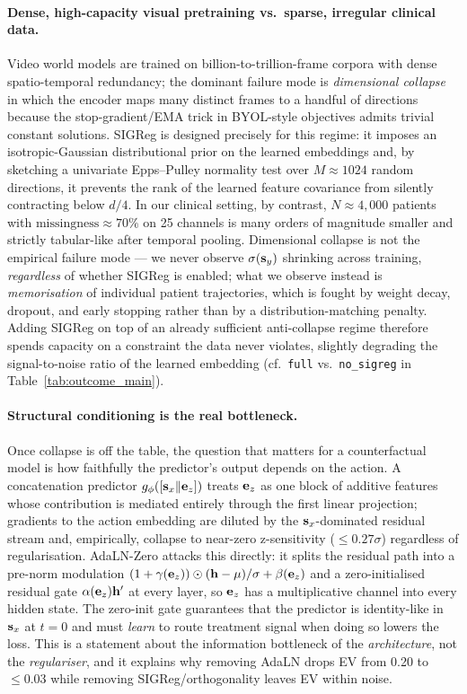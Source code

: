 \paragraph{Dense, high-capacity visual pretraining vs.\ sparse,
irregular clinical data.} Video world models are trained on
billion-to-trillion-frame corpora with dense spatio-temporal redundancy;
the dominant failure mode is \emph{dimensional collapse} in which the
encoder maps many distinct frames to a handful of directions because
the stop-gradient/EMA trick in BYOL-style objectives admits trivial
constant solutions. SIGReg is designed precisely for this regime: it
imposes an isotropic-Gaussian distributional prior on the learned
embeddings and, by sketching a univariate Epps--Pulley normality test
over $M{\approx}1024$ random directions, it prevents the rank of the
learned feature covariance from silently contracting below $d/4$.
In our clinical setting, by contrast, $N{\approx}4{,}000$ patients with
$\mathrm{missingness}\approx 70\%$ on 25 channels is many orders of
magnitude smaller and strictly tabular-like after temporal pooling.
Dimensional collapse is not the empirical failure mode --- we never
observe $\sigma(\mathbf{s}_y)$ shrinking across training, \emph{regardless} of
whether SIGReg is enabled; what we observe instead is
\emph{memorisation} of individual patient trajectories, which is fought
by weight decay, dropout, and early stopping rather than by a
distribution-matching penalty. Adding SIGReg on top of an already
sufficient anti-collapse regime therefore spends capacity on a
constraint the data never violates, slightly degrading the signal-to-noise
ratio of the learned embedding (cf.\ \texttt{full} vs.\ \texttt{no\_sigreg}
in Table~\ref{tab:outcome_main}).

\paragraph{Structural conditioning is the real bottleneck.} Once
collapse is off the table, the question that matters for a
counterfactual model is how faithfully the predictor's output depends
on the action. A concatenation predictor
$g_\phi([\mathbf{s}_x \Vert \mathbf{e}_z])$ treats $\mathbf{e}_z$ as one block of additive features
whose contribution is mediated entirely through the first linear
projection; gradients to the action embedding are diluted by the
$\mathbf{s}_x$-dominated residual stream and, empirically, collapse to near-zero
z-sensitivity ($\leq 0.27\sigma$) regardless of regularisation. AdaLN-Zero
attacks this directly: it splits the residual path into a pre-norm
modulation $(1+\gamma(\mathbf{e}_z))\odot(\mathbf{h}-\mu)/\sigma + \beta(\mathbf{e}_z)$
and a zero-initialised residual gate $\alpha(\mathbf{e}_z)\mathbf{h}^\prime$ at
every layer, so $\mathbf{e}_z$ has a multiplicative channel into every hidden
state. The zero-init gate guarantees that the predictor is identity-like
in $\mathbf{s}_x$ at $t{=}0$ and must \emph{learn} to route treatment signal when
doing so lowers the loss. This is a statement about the information
bottleneck of the \emph{architecture}, not the \emph{regulariser}, and
it explains why removing AdaLN drops EV from 0.20 to $\leq 0.03$ while
removing SIGReg/orthogonality leaves EV within noise.


